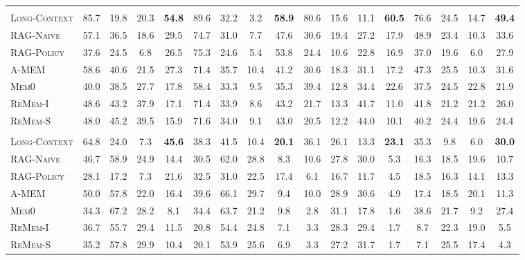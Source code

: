 \documentclass{llmxive}
\begin{document}
\begin{table}[t]
{\begin{tabular}{lccc>{\columncolor{cuscol}}c|ccc>{\columncolor{cuscol}}c|ccc>{\columncolor{cuscol}}c|ccc>{\columncolor{cuscol}}c}
\rowcolor{llmheader}
\multicolumn{17}{c}{\textbf{\texttt{GPT-5-mini}}} \\
\textsc{Long-Context} & 85.7 & 19.8 & 20.3 & \textbf{54.8} & 89.6 & 32.2 & 3.2 & \textbf{58.9} & 80.6 & 15.6 & 11.1 & \textbf{60.5} & 76.6 & 24.5 & 14.7 & \textbf{49.4} \\
\textsc{RAG-Naive}\citep{lewis2020retrieval}    & 57.1 & 36.5 & 18.6 & 29.5 & 74.7 & 31.0 & 7.7 & 47.6 & 30.6 & 19.4 & 27.2 & 17.9 & 48.9 & 23.4 & 10.3 & 33.6 \\
\textsc{RAG-Policy}   & 37.6 & 24.5 & 6.8 & 26.5 & 75.3 & 24.6 & 5.4 & 53.8 & 24.4 & 10.6 & 22.8 & 16.9 & 37.0 & 19.6 & 6.0 & 27.9 \\
\textsc{A-MEM}~\citep{xu2026mem}        & 58.6 & 40.6 & 21.5 & 27.3 & 71.4 & 35.7 & 10.4 & 41.2 & 30.6 & 18.3 & 31.1 & 17.2 & 47.3 & 25.5 & 10.3 & 31.6 \\
\textsc{Mem0}~\citep{chhikara2025mem0}         & 40.0 & 38.5 & 27.7 & 17.8 & 58.4 & 33.3 & 9.5 & 35.3 & 39.4 & 12.8 & 34.4 & 22.6 & 37.5 & 24.5 & 22.8 & 21.9 \\
\textsc{ReMem-I}~\citep{shu2026remem}      & 48.6 & 43.2 & 37.9 & 17.1 & 71.4 & 33.9 & 8.6 & 43.2 & 21.7 & 13.3 & 41.7 & 11.0 & 41.8 & 21.2 & 21.2 & 26.0 \\
\textsc{ReMem-S}~\citep{shu2026remem}      & 48.0 & 45.2 & 39.5 & 15.9 & 71.6 & 34.0 & 9.1 & 43.0 & 20.5 & 12.2 & 44.0 & 10.1 & 40.2 & 24.4 & 19.6 & 24.4 \\
\midrule

\rowcolor{llmheader}
\multicolumn{17}{c}{\textbf{\texttt{GPT-4o-mini}}} \\
\textsc{Long-Context} & 64.8 & 24.0 & 7.3 & \textbf{45.6} & 38.3 & 41.5 & 10.4 & \textbf{20.1} & 36.1 & 26.1 & 13.3 & \textbf{23.1} & 35.3 & 9.8 & 6.0 & \textbf{30.0} \\
\textsc{RAG-Naive}\citep{lewis2020retrieval}    & 46.7 & 58.9 & 24.9 & 14.4 & 30.5 & 62.0 & 28.8 & 8.3 & 10.6 & 27.8 & 30.0 & 5.3 & 16.3 & 18.5 & 19.6 & 10.7 \\
\textsc{RAG-Policy}   & 28.1 & 17.2 & 7.3 & 21.6 & 32.5 & 31.0 & 22.5 & 17.4 & 6.1 & 16.7 & 11.7 & 4.5 & 18.5 & 16.3 & 14.1 & 13.3 \\
\textsc{A-MEM}~\citep{xu2026mem}        & 50.0 & 57.8 & 22.0 & 16.4 & 39.6 & 66.1 & 29.7 & 9.4 & 10.0 & 28.9 & 30.6 & 4.9 & 17.4 & 18.5 & 20.1 & 11.3 \\
\textsc{Mem0}~\citep{chhikara2025mem0}         & 34.3 & 67.2 & 28.2 & 8.1 & 34.4 & 63.7 & 21.2 & 9.8 & 2.8 & 31.1 & 17.8 & 1.6 & 38.6 & 21.7 & 9.2 & 27.4 \\
\textsc{ReMem-I}~\citep{shu2026remem}      & 36.7 & 55.7 & 29.4 & 11.5 & 20.8 & 54.4 & 24.8 & 7.1 & 3.3 & 28.3 & 29.4 & 1.7 & 8.7 & 22.3 & 19.0 & 5.5 \\
\textsc{ReMem-S}~\citep{shu2026remem}      & 35.2 & 57.8 & 29.9 & 10.4 & 20.1 & 53.9 & 25.6 & 6.9 & 3.3 & 27.2 & 31.7 & 1.7 & 7.1 & 25.5 & 17.4 & 4.3 \\
\midrule


\end{tabular}}
\end{table}
\end{document}
